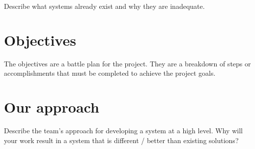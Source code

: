 Describe what systems already exist and why they are inadequate. 

\section{Objectives}
The objectives are a battle plan for the project. They are a breakdown of steps or accomplishments that must be completed to achieve the project goals.

\section{Our approach}
Describe the team's approach for developing a system at a high level. Why will your work result in a system that is different / better than existing solutions? 
